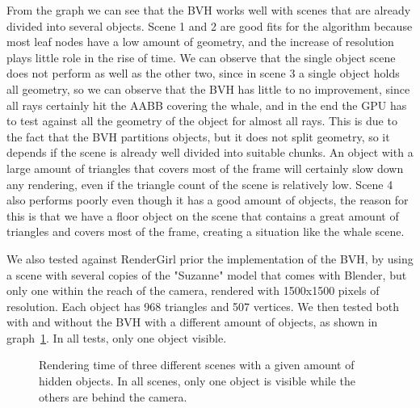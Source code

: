 \documentclass{vgtc}
\begin{document}
From the graph we can see that the BVH works well with scenes that are
already divided into several objects. Scene 1 and 2 are good fits for
the algorithm because most leaf nodes have a low amount of geometry,
and the increase of resolution plays little role in the rise of
time. We can observe that the single object scene does not perform as
well as the other two, since in scene 3 a single object holds all
geometry, so we can observe that the BVH has little to no improvement,
since all rays certainly hit the AABB covering the whale, and in the
end the GPU has to test against all the geometry of the object for
almost all rays. This is due to the fact that the BVH partitions
objects, but it does not split geometry, so it depends if the scene
is already well divided into suitable chunks. An object with a large
amount of triangles that covers most of the frame will certainly slow
down any rendering, even if the triangle count of the scene is
relatively low. Scene 4 also performs poorly even though it has a good
amount of objects, the reason for this is that we have a floor object
on the scene that contains a great amount of triangles and covers most
of the frame, creating a situation like the whale scene.

We also tested against RenderGirl prior the implementation of the BVH,
by using a scene with several copies of the "Suzanne" model that comes
with Blender, but only one within the reach of the camera, rendered
with 1500x1500 pixels of resolution. Each object has 968 triangles and
507 vertices. We then tested both with and without the BVH with a
different amount of objects, as shown in
graph~\ref{fig:bvh-no-bvh-results}. In all tests, only one object
visible.

\begin{figure}
\centering
{}
\caption{Rendering time of three different scenes with a given amount
  of hidden objects. In all scenes, only one object is visible while
  the others are behind the camera.}
\label{fig:bvh-no-bvh-results}
\end{figure}
\end{document}
